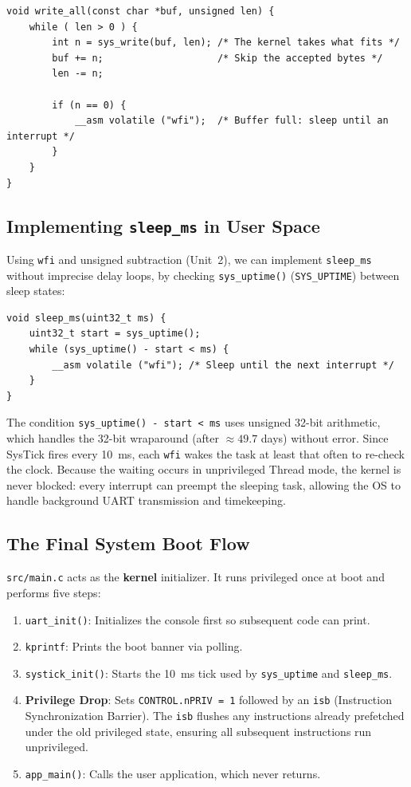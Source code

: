 \begin{lstlisting}
void write_all(const char *buf, unsigned len) {
    while ( len > 0 ) {
        int n = sys_write(buf, len); /* The kernel takes what fits */
        buf += n;                    /* Skip the accepted bytes */
        len -= n;
        
        if (n == 0) {
            __asm volatile ("wfi");  /* Buffer full: sleep until an interrupt */
        }
    }
}
\end{lstlisting}

\subsection{Implementing \texttt{sleep\_ms} in User Space}
Using \texttt{wfi} and unsigned subtraction (Unit~2), we can implement \texttt{sleep\_ms} without imprecise delay loops, by checking \texttt{sys\_uptime()} (\texttt{SYS\_UPTIME}) between sleep states:

\begin{lstlisting}
void sleep_ms(uint32_t ms) {
    uint32_t start = sys_uptime();
    while (sys_uptime() - start < ms) {
        __asm volatile ("wfi"); /* Sleep until the next interrupt */
    }
}
\end{lstlisting}

The condition \texttt{sys\_uptime() - start < ms} uses unsigned 32-bit arithmetic, which handles the 32-bit wraparound (after $\approx 49.7$ days) without error. Since SysTick fires every 10~ms, each \texttt{wfi} wakes the task at least that often to re-check the clock. Because the waiting occurs in unprivileged Thread mode, the kernel is never blocked: every interrupt can preempt the sleeping task, allowing the OS to handle background UART transmission and timekeeping.

\subsection{The Final System Boot Flow}
\texttt{src/main.c} acts as the \textbf{kernel} initializer. It runs privileged once at boot and performs five steps:
\begin{enumerate}
    \item \texttt{uart\_init()}: Initializes the console first so subsequent code can print.
    \item \texttt{kprintf}: Prints the boot banner via polling.
    \item \texttt{systick\_init()}: Starts the 10~ms tick used by \texttt{sys\_uptime} and \texttt{sleep\_ms}.
    \item \textbf{Privilege Drop}: Sets \texttt{CONTROL.nPRIV = 1} followed by an \texttt{isb} (Instruction Synchronization Barrier). The \texttt{isb} flushes any instructions already prefetched under the old privileged state, ensuring all subsequent instructions run unprivileged.
    \item \texttt{app\_main()}: Calls the user application, which never returns.
\end{enumerate}

